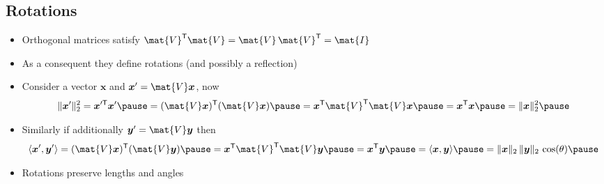 \documentclass[25pt,landscape,footrule]{foils}
\begin{document}

\begin{slide}
\section[-2]{Rotations}

\begin{PauseHighLight}
  \begin{itemize}
  \item Orthogonal matrices satisfy $\mat{V}^\tr \mat{V} = \mat{V}\,
    \mat{V}^\tr=\mat{I}$\pause
  \item As a consequent they define rotations (and possibly a reflection)\pause
  \item Consider a vector $\bm{x}$ and $\bm{x}'=\mat{V}\bm{x}$, now
    \begin{align*}
      \| \bm{x}' \|_2^2 = \bm{x}^{\prime\tr}\bm{x}'\pause
      = (\mat{V}\bm{x})^\tr (\mat{V}\bm{x})\pause
      = \bm{x}^\tr \mat{V}^\tr \mat{V} \bm{x}\pause
      = \bm{x}^\tr \bm{x} \pause = \| \bm{x} \|_2^2 \pause
    \end{align*}
  \item Similarly if additionally $\bm{y}'=\mat{V}\bm{y}$ then
    {\small
    \begin{align*}
      \langle \bm{x}', \bm{y}' \rangle = (\mat{V}\bm{x})^\tr
      (\mat{V}\bm{y})\pause
       = \bm{x}^\tr \mat{V}^\tr \mat{V} \bm{y}\pause
       = \bm{x}^\tr \bm{y} \pause = \langle \bm{x}, \bm{y} \rangle\pause
       = \| \bm{x} \|_2 \, \| \bm{y} \|_2 \, \cos(\theta)\pause
    \end{align*}}
  \item Rotations preserve lengths and angles\pause
  \end{itemize}
\end{PauseHighLight}

\end{slide}

\end{document}
